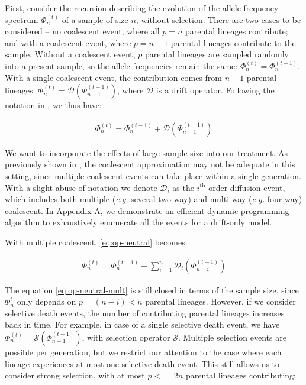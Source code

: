 \documentclass[review]{elsarticle}
\begin{document}
First, consider the recursion describing the evolution of the allele frequency spectrum
$\Phi_{n}^{(t)}$ of a sample of size $n$, without selection. There are two cases to be considered --
no coalescent event, where all $p=n$ parental lineages contribute; and with a coalescent event,
where $p=n-1$ parental lineages contribute to the sample. Without a coalescent event, $p$ parental
lineages are sampled randomly into a present sample, so the allele frequencies remain the same:
$\Phi_{n}^{(t)}=\Phi_{n}^{(t-1)}$. With a single coalescent event, the contribution comes from $n-1$
parental lineages: $\Phi_{n}^{(t)}=\mathcal{D}(\Phi_{n-1}^{(t-1)})$, where $\mathcal{D}$ is a drift
operator. Following the notation in \cite{JouganousEtAl2017}, we thus have:

\begin{align}
  \label{eq:op-neutral}
  \Phi_{n}^{(t)}=\Phi_{n}^{(t-1)}+\mathcal{D}(\Phi_{n-1}^{(t-1)})
\end{align}

We want to incorporate the effects of large sample size into our treatment. As previously shown in
\cite{BhaskarEtAl2014,NelsonEtAl2019}, the coalescent approximation may not be adequate in this
setting, since multiple coalescent events can take place within a single generation. With a slight
abuse of notation we denote $\mathcal{D}_i$ as the $i^{\text{th}}$-order diffusion event, which includes both
multiple (\textit{e.g.} several two-way) and multi-way (\textit{e.g.} four-way) coalescent. In
Appendix A, we demonstrate an efficient dynamic programming algorithm to exhaustively enumerate all
the events for a drift-only model.

With multiple coalescent, \eqref{eq:op-neutral} becomes:

\begin{align}
  \label{eq:op-neutral-mult}
  \Phi_{n}^{(t)}=\Phi_{n}^{(t-1)}+\sum_{i=1}^{n}\mathcal{D}_i(\Phi_{n-i}^{(t-1)})
\end{align}

The equation \eqref{eq:op-neutral-mult} is still closed in terms of the sample size, since
$\Phi_{n}^{t}$ only depends on $p=(n-i)<n$ parental lineages. However, if we consider
selective death events, the number of contributing parental lineages increases back in time. For
example, in case of a single selective death event, we have
$\Phi_{n}^{(t)}=\mathcal{S}(\Phi_{n+1}^{(t-1)})$, with selection operator $\mathcal{S}$. Multiple
selection events are possible per generation, but we restrict our attention to the case where each
lineage experiences at most one selective death event. This still allows us to consider strong
selection, with at most $p<=2n$ parental lineages contributing:
\end{document}
